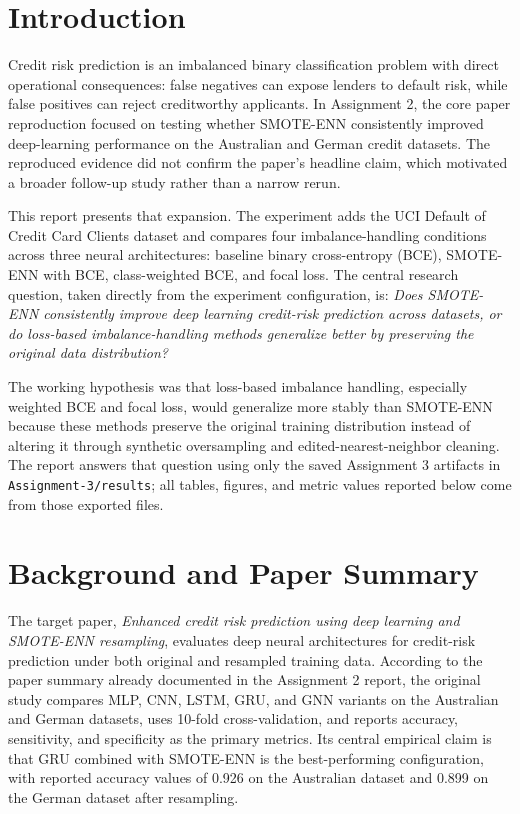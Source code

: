 \documentclass[11pt,a4paper]{article}
\begin{document}
\section{Introduction}
Credit risk prediction is an imbalanced binary classification problem with direct operational consequences: false negatives can expose lenders to default risk, while false positives can reject creditworthy applicants. In Assignment 2, the core paper reproduction focused on testing whether SMOTE-ENN consistently improved deep-learning performance on the Australian and German credit datasets. The reproduced evidence did not confirm the paper's headline claim, which motivated a broader follow-up study rather than a narrow rerun.

This report presents that expansion. The experiment adds the UCI Default of Credit Card Clients dataset and compares four imbalance-handling conditions across three neural architectures: baseline binary cross-entropy (BCE), SMOTE-ENN with BCE, class-weighted BCE, and focal loss. The central research question, taken directly from the experiment configuration, is: \emph{Does SMOTE-ENN consistently improve deep learning credit-risk prediction across datasets, or do loss-based imbalance-handling methods generalize better by preserving the original data distribution?}

The working hypothesis was that loss-based imbalance handling, especially weighted BCE and focal loss, would generalize more stably than SMOTE-ENN because these methods preserve the original training distribution instead of altering it through synthetic oversampling and edited-nearest-neighbor cleaning. The report answers that question using only the saved Assignment 3 artifacts in \texttt{Assignment-3/results}; all tables, figures, and metric values reported below come from those exported files.

\section{Background and Paper Summary}
The target paper, \emph{Enhanced credit risk prediction using deep learning and SMOTE-ENN resampling}, evaluates deep neural architectures for credit-risk prediction under both original and resampled training data. According to the paper summary already documented in the Assignment 2 report, the original study compares MLP, CNN, LSTM, GRU, and GNN variants on the Australian and German datasets, uses 10-fold cross-validation, and reports accuracy, sensitivity, and specificity as the primary metrics. Its central empirical claim is that GRU combined with SMOTE-ENN is the best-performing configuration, with reported accuracy values of 0.926 on the Australian dataset and 0.899 on the German dataset after resampling.
\end{document}
